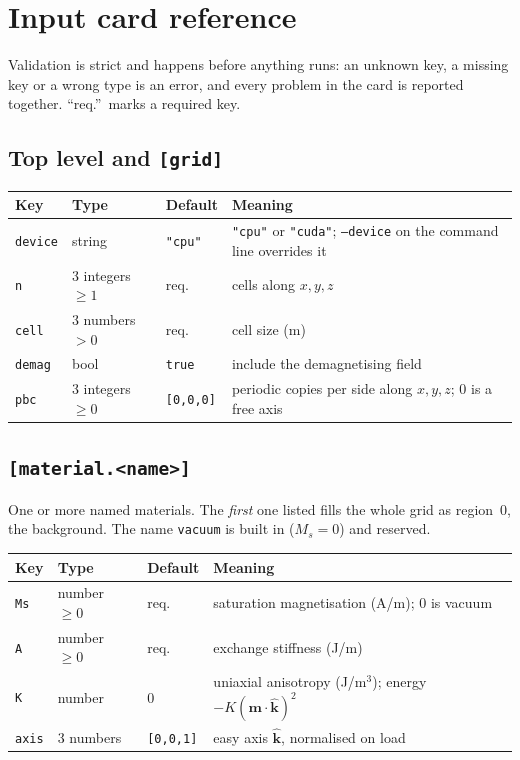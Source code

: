 \documentclass[10pt,a4paper]{article}
\newcommand{\code}[1]{\texttt{#1}}
\newcommand{\vm}{\mathbf{m}}
\newcommand{\kh}{\hat{\mathbf{k}}}
\begin{document}
\section{Input card reference}
\label{sec:cards}

Validation is strict and happens before anything runs: an unknown key, a missing key or a wrong type is an error, and
every problem in the card is reported together. ``req.''\ marks a required key.

\subsection{Top level and \code{[grid]}}
\begin{tabularx}{\textwidth}{@{}l l l Y@{}}
\toprule
Key & Type & Default & Meaning \\
\midrule
\code{device} & string & \code{"cpu"} & \code{"cpu"} or \code{"cuda"}; \code{--device} on the command line overrides it \\
\code{n} & 3 integers $\geq 1$ & req. & cells along $x, y, z$ \\
\code{cell} & 3 numbers $>0$ & req. & cell size (m) \\
\code{demag} & bool & \code{true} & include the demagnetising field \\
\code{pbc} & 3 integers $\geq0$ & \code{[0,0,0]} & periodic copies per side along $x, y, z$; 0 is a free axis \\
\bottomrule
\end{tabularx}

\subsection{\code{[material.<name>]}}
One or more named materials. The \emph{first} one listed fills the whole grid as region~0, the background. The name
\code{vacuum} is built in ($M_s=0$) and reserved.

\begin{tabularx}{\textwidth}{@{}l l l Y@{}}
\toprule
Key & Type & Default & Meaning \\
\midrule
\code{Ms} & number $\geq 0$ & req. & saturation magnetisation (A/m); 0 is vacuum \\
\code{A} & number $\geq 0$ & req. & exchange stiffness (J/m) \\
\code{K} & number & 0 & uniaxial anisotropy (J/m$^3$); energy $-K(\vm\cdot\kh)^2$ \\
\code{axis} & 3 numbers & \code{[0,0,1]} & easy axis $\kh$, normalised on load \\
\bottomrule
\end{tabularx}
\end{document}
